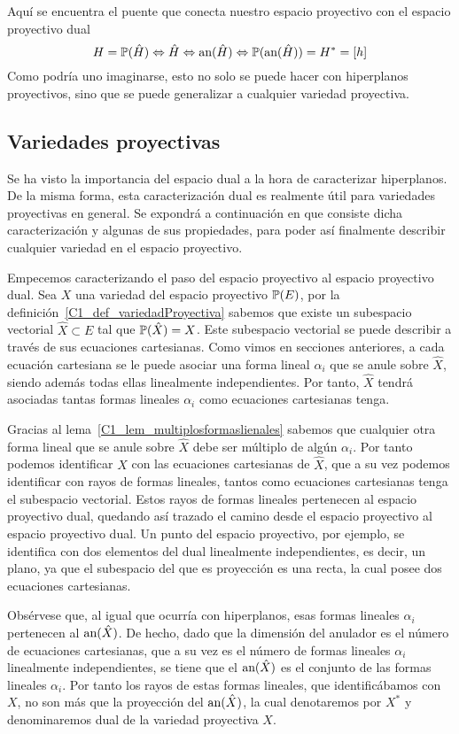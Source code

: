 Aquí se encuentra el puente que conecta nuestro espacio proyectivo con el espacio proyectivo dual
\begin{equation}
H=\mathbb{P}(\hat{H})\Leftrightarrow \hat{H}\Leftrightarrow \text{an}(\hat{H})\Leftrightarrow \mathbb{P}(\text{an}(\hat{H}))=H^*=[h]
\end{equation}
Como podría uno imaginarse, esto no solo se puede hacer con hiperplanos proyectivos, sino que se puede generalizar a cualquier variedad proyectiva.
\subsection{Variedades proyectivas}
Se ha visto la importancia del espacio dual a la hora de caracterizar hiperplanos. De la misma forma, esta caracterización dual es realmente útil para variedades proyectivas en general. Se expondrá a continuación en que consiste dicha caracterización y algunas de sus propiedades, para poder así finalmente describir cualquier variedad en el espacio proyectivo.

Empecemos caracterizando el paso del espacio proyectivo al espacio proyectivo dual. Sea $X$ una variedad del espacio proyectivo $\mathbb{P}(E)$, por la definición~\ref{C1_def_variedadProyectiva} sabemos que existe un subespacio vectorial $\hat{X}\subset E$ tal que $\mathbb{P}(\hat{X})=X$. Este subespacio vectorial se puede describir a través de sus ecuaciones cartesianas. Como vimos en secciones anteriores, a cada ecuación cartesiana se le puede asociar una forma lineal $\alpha_i$ que se anule sobre $\hat{X}$, siendo además todas ellas linealmente independientes. Por tanto, $\hat{X}$ tendrá asociadas tantas formas lineales $\alpha_i$ como ecuaciones cartesianas tenga. 

Gracias al lema~\ref{C1_lem_multiplosformaslienales} sabemos que cualquier otra forma lineal que se anule sobre $\hat{X}$ debe ser múltiplo de algún $\alpha_i$. Por tanto podemos identificar $X$ con las ecuaciones cartesianas de $\hat{X}$, que a su vez podemos identificar con rayos de formas lineales, tantos como ecuaciones cartesianas tenga el subespacio vectorial. Estos rayos de formas lineales pertenecen al espacio proyectivo dual, quedando así trazado el camino desde el espacio proyectivo al espacio proyectivo dual. Un punto del espacio proyectivo, por ejemplo, se identifica con dos elementos del dual linealmente independientes, es decir, un plano, ya que el subespacio del que es proyección es una recta, la cual posee dos ecuaciones cartesianas.

Obsérvese que, al igual que ocurría con hiperplanos, esas formas lineales $\alpha_i$ pertenecen al $\text{an}(\hat{X})$. De hecho, dado que la dimensión del anulador es el número de ecuaciones cartesianas, que a su vez es el número de formas lineales $\alpha_i$ linealmente independientes, se tiene que el $\text{an}(\hat{X})$ es el conjunto de las formas lineales $\alpha_i$. Por tanto los rayos de estas formas lineales, que identificábamos con $X$, no son más que la proyección del $\text{an}(\hat{X})$, la cual denotaremos por $X^*$ y denominaremos dual de la variedad proyectiva $X$.

